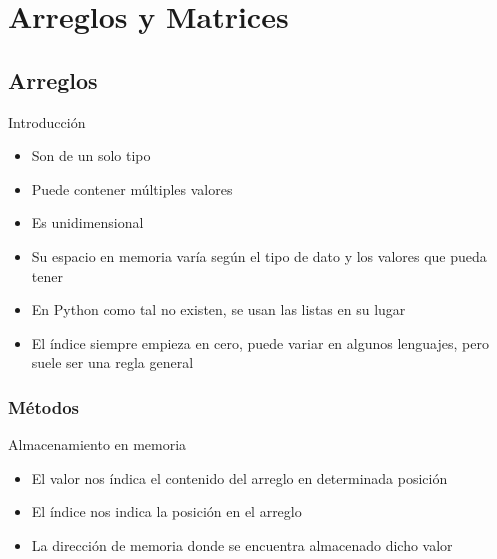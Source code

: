 \documentclass{beamer}
\begin{document}
\section{Arreglos  y Matrices}

\subsection{Arreglos}
\begin{frame}{Introducci\'on}
    \begin{itemize}
            \item Son de un solo tipo
            \item Puede contener m\'ultiples valores
            \item Es unidimensional
            \item Su espacio en memoria var\'ia seg\'un el tipo de dato y los valores que pueda tener
            \item En Python como tal no existen,  se usan las listas en su lugar
            \item El \'indice siempre empieza en cero, puede variar en algunos lenguajes, pero suele ser una regla general
        \end{itemize}
\end{frame}

\subsubsection{M\'etodos}

\begin{frame}{Almacenamiento en memoria}
	\begin{itemize}
		\item El valor nos \'indica el contenido del arreglo en determinada posici\'on
		\item El \'indice nos indica la posici\'on en el arreglo
		\item La direcci\'on de memoria donde se encuentra almacenado dicho valor	
	\end{itemize}
	\centering
\end{frame}
\end{document}

